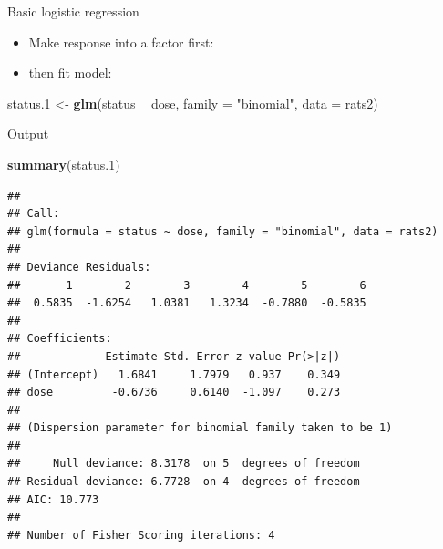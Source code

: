 \documentclass[
  ignorenonframetext,
]{beamer}
\newenvironment{Shaded}{\begin{snugshade}}{\end{snugshade}}
\newcommand{\DataTypeTok}[1]{\textcolor[rgb]{0.13,0.29,0.53}{#1}}
\newcommand{\FloatTok}[1]{\textcolor[rgb]{0.00,0.00,0.81}{#1}}
\newcommand{\KeywordTok}[1]{\textcolor[rgb]{0.13,0.29,0.53}{\textbf{#1}}}
\newcommand{\NormalTok}[1]{#1}
\newcommand{\OperatorTok}[1]{\textcolor[rgb]{0.81,0.36,0.00}{\textbf{#1}}}
\newcommand{\StringTok}[1]{\textcolor[rgb]{0.31,0.60,0.02}{#1}}
\providecommand{\tightlist}{%
  \setlength{\itemsep}{0pt}\setlength{\parskip}{0pt}}
\begin{document}
\begin{frame}[fragile]{Basic logistic regression}
\protect\hypertarget{basic-logistic-regression}{}

\begin{itemize}
\tightlist
\item
  Make response into a factor first:
\end{itemize}

\small

\begin{Shaded}
\end{Shaded}

\normalsize

\begin{itemize}
\tightlist
\item
  then fit model:
\end{itemize}

\small

\begin{Shaded}
\begin{Highlighting}[]
\NormalTok{status}\FloatTok{.1}\NormalTok{ <-}\StringTok{ }\KeywordTok{glm}\NormalTok{(status }\OperatorTok{~}\StringTok{ }\NormalTok{dose, }\DataTypeTok{family =} \StringTok{"binomial"}\NormalTok{, }\DataTypeTok{data =}\NormalTok{ rats2)}
\end{Highlighting}
\end{Shaded}

\normalsize

\end{frame}

\begin{frame}[fragile]{Output}
\protect\hypertarget{output-1}{}

\scriptsize

\begin{Shaded}
\begin{Highlighting}[]
\KeywordTok{summary}\NormalTok{(status}\FloatTok{.1}\NormalTok{)}
\end{Highlighting}
\end{Shaded}

\begin{verbatim}
## 
## Call:
## glm(formula = status ~ dose, family = "binomial", data = rats2)
## 
## Deviance Residuals: 
##       1        2        3        4        5        6  
##  0.5835  -1.6254   1.0381   1.3234  -0.7880  -0.5835  
## 
## Coefficients:
##             Estimate Std. Error z value Pr(>|z|)
## (Intercept)   1.6841     1.7979   0.937    0.349
## dose         -0.6736     0.6140  -1.097    0.273
## 
## (Dispersion parameter for binomial family taken to be 1)
## 
##     Null deviance: 8.3178  on 5  degrees of freedom
## Residual deviance: 6.7728  on 4  degrees of freedom
## AIC: 10.773
## 
## Number of Fisher Scoring iterations: 4
\end{verbatim}

\normalsize

\end{frame}
\end{document}
